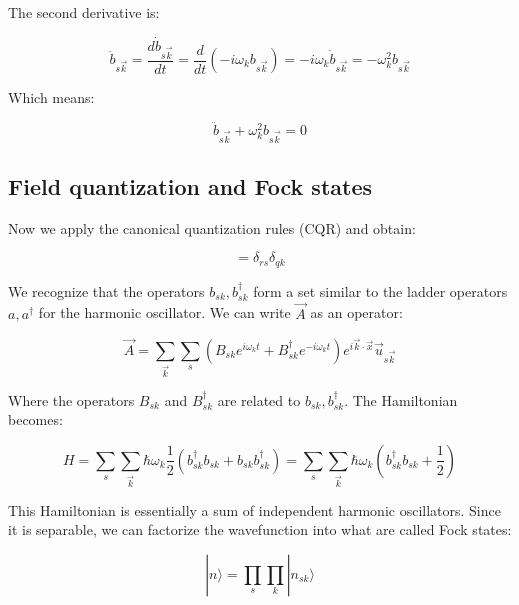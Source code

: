 \documentclass[italian]{HKNdocument}
\begin{document}
The second derivative is:

\begin{equation}
\ddot{b}_{s\vec{k}}=\frac{d\dot{b}_{s\vec{k}}}{dt}=\frac{d}{dt}(-i\omega_kb_{s\vec{k}})=-i\omega_k\dot{b}_{s\vec{k}}=-\omega_k^2b_{s\vec{k}} \label{eq:15.16}
\end{equation}

Which means:

\begin{equation}
\ddot{b}_{s\vec{k}}+\omega_k^2b_{s\vec{k}}=0 \label{eq:15.17}
\end{equation}

\subsection{Field quantization and Fock states}
Now we apply the canonical quantization rules (CQR) and obtain:

\begin{equation}
[b_{sk},b_{rq}^\dagger]=\delta_{rs}\delta_{qk} \label{eq:15.18}
\end{equation}

We recognize that the operators $b_{sk}, b_{sk}^\dagger$ form a set similar to the ladder operators $a, a^\dagger$ for the harmonic oscillator. We can write $\vec{A}$ as an operator:

\begin{equation}
\vec{A}=\sum_{\vec{k}}\sum_s(B_{sk}e^{i\omega_k t}+B_{sk}^\dagger e^{-i\omega_k t})e^{i\vec{k}\cdot\vec{x}}\vec{u}_{s\vec{k}} \label{eq:15.19}
\end{equation}

Where the operators $B_{sk}$ and $B_{sk}^\dagger$ are related to $b_{sk}, b_{sk}^\dagger$. The Hamiltonian becomes:

\begin{equation}
H=\sum_s\sum_{\vec{k}}\hbar\omega_k\frac{1}{2}(b_{sk}^\dagger b_{sk}+b_{sk}b_{sk}^\dagger)=\sum_s\sum_{\vec{k}}\hbar\omega_k(b_{sk}^\dagger b_{sk}+\frac{1}{2}) \label{eq:15.20}
\end{equation}


This Hamiltonian is essentially a sum of independent harmonic oscillators. Since it is separable, we can factorize the wavefunction into what are called Fock states:

\begin{equation}
|n\rangle=\prod_s\prod_k|n_{sk}\rangle \label{eq:15.21}
\end{equation}
\end{document}
